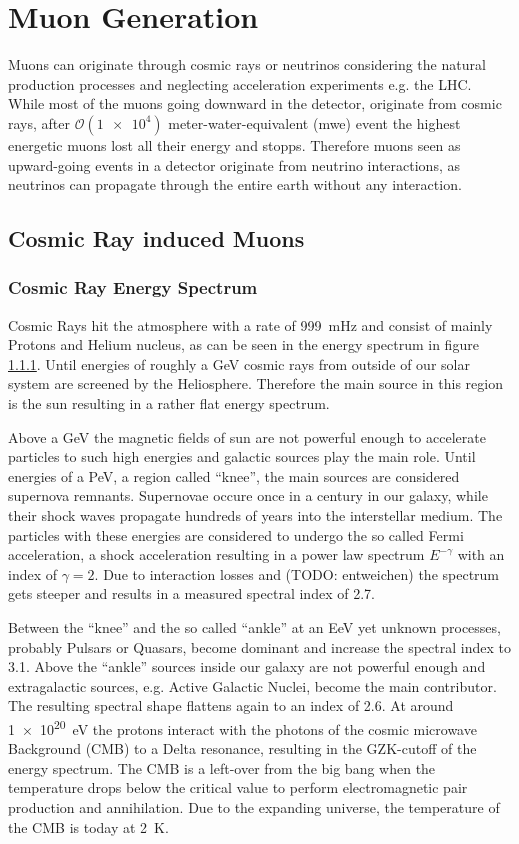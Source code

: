 \chapter{Muon Generation}

Muons can originate through cosmic rays or neutrinos considering the natural production processes and neglecting acceleration experiments e.g. the LHC.
While most of the muons going downward in the detector, originate from cosmic rays, after $\mathcal{O}(\num{1e4})$ meter-water-equivalent (mwe) event the highest energetic muons lost all their energy and stopps.
Therefore muons seen as upward-going events in a detector originate from neutrino interactions, as neutrinos can propagate through the entire earth without any interaction.

\section{Cosmic Ray induced Muons}

\subsection{Cosmic Ray Energy Spectrum}

Cosmic Rays hit the atmosphere with a rate of \SI{999}{\milli\hertz} and consist of mainly Protons and Helium nucleus, as can be seen in the energy spectrum in figure \ref{}.
Until energies of roughly a GeV cosmic rays from outside of our solar system are screened by the Heliosphere.
Therefore the main source in this region is the sun resulting in a rather flat energy spectrum.

Above a GeV the magnetic fields of sun are not powerful enough to accelerate particles to such high energies and galactic sources play the main role.
Until energies of a PeV, a region called \enquote{knee}, the main sources are considered supernova remnants.
Supernovae occure once in a century in our galaxy, while their shock waves propagate hundreds of years into the interstellar medium.
The particles with these energies are considered to undergo the so called Fermi acceleration, a shock acceleration resulting in a power law spectrum $E^{-\gamma}$ with an index of $\gamma = \num{2}$.
Due to interaction losses and (TODO: entweichen) the spectrum gets steeper and results in a measured spectral index of \num{2.7}.

Between the \enquote{knee} and the so called \enquote{ankle} at an EeV yet unknown processes, probably Pulsars or Quasars, become dominant and increase the spectral index to \num{3.1}.
Above the \enquote{ankle} sources inside our galaxy are not powerful enough and extragalactic sources, e.g. Active Galactic Nuclei, become the main contributor.
The resulting spectral shape flattens again to an index of \num{2.6}.
At around \SI{1e20}{eV} the protons interact with the photons of the cosmic microwave Background (CMB) to a Delta resonance, resulting in the GZK-cutoff of the energy spectrum.
The CMB is a left-over from the big bang when the temperature drops below the critical value to perform electromagnetic pair production and annihilation.
Due to the expanding universe, the temperature of the CMB is today at \SI{2}{K}.

